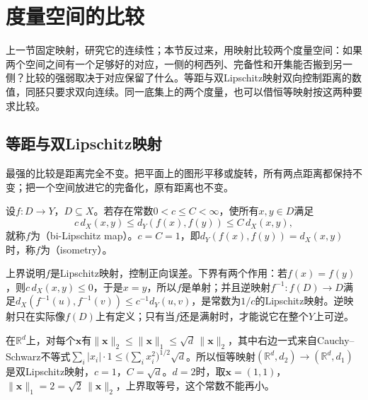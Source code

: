 \section{度量空间的比较}
\label{sec:metric-comparison}

上一节固定映射，研究它的连续性；本节反过来，用映射比较两个度量空间：如果两个空间之间有一个足够好的对应，一侧的柯西列、完备性和开集能否搬到另一侧？比较的强弱取决于对应保留了什么。等距与双Lipschitz映射双向控制距离的数值，同胚只要求双向连续。同一底集上的两个度量，也可以借恒等映射按这两种要求比较。

\subsection{等距与双Lipschitz映射}
\label{sec:metric-bilipschitz}

最强的比较是距离完全不变。把平面上的图形平移或旋转，所有两点距离都保持不变；把一个空间放进它的完备化，原有距离也不变。

\begin{definition}[等距与双Lipschitz映射]
\label{def:metric-bilipschitz}
设$f:D\to Y$，$D\subseteq X$。若存在常数$0<c\leq C<\infty$，使所有$x,y\in D$满足
\begin{equation}
\label{eq:metric-bilipschitz}
  c\,d_X(x,y)\leq d_Y(f(x),f(y))\leq C\,d_X(x,y),
\end{equation}
就称$f$为（bi-Lipschitz map）。$c=C=1$，即$d_Y(f(x),f(y))=d_X(x,y)$时，称$f$为（isometry）。
\end{definition}

上界说明$f$是Lipschitz映射，控制正向误差。下界有两个作用：若$f(x)=f(y)$，则$c\,d_X(x,y)\leq0$，于是$x=y$，所以$f$是单射；并且逆映射$f^{-1}:f(D)\to D$满足$d_X(f^{-1}(u),f^{-1}(v))\leq c^{-1}d_Y(u,v)$，是常数为$1/c$的Lipschitz映射。逆映射只在实际像$f(D)$上有定义；只有当$f$还是满射时，才能说它在整个$Y$上可逆。

\begin{example}[有限维范数之间的恒等映射]
\label{ex:metric-identity-bilipschitz}
在$\mathbb R^d$上，对每个$\bm x$有$\lVert\bm x\rVert_2\leq\lVert\bm x\rVert_1\leq\sqrt d\,\lVert\bm x\rVert_2$，其中右边一式来自Cauchy--Schwarz不等式$\sum_i|x_i|\cdot1\leq\bigl(\sum_ix_i^2\bigr)^{1/2}\sqrt d$。所以恒等映射$(\mathbb R^d,d_2)\to(\mathbb R^d,d_1)$是双Lipschitz映射，$c=1$，$C=\sqrt d$。$d=2$时，取$\bm x=(1,1)$，$\lVert\bm x\rVert_1=2=\sqrt2\,\lVert\bm x\rVert_2$，上界取等号，这个常数不能再小。
\end{example}

